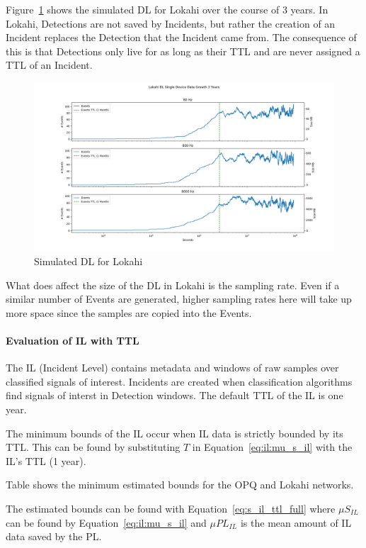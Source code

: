 Figure~\ref{fig:sim_dl_lokahi} shows the simulated DL for Lokahi over the course of 3 years. In Lokahi, Detections are not saved by Incidents, but rather the creation of an Incident replaces the Detection that the Incident came from. The consequence of this is that Detections only live for as long as their TTL and are never assigned a TTL of an Incident.

\begin{figure}[H]
	\centering
	\includegraphics[width=\linewidth]{figures/sim_dl_lokahi.png}
	\caption{Simulated DL for Lokahi}
	\label{fig:sim_dl_lokahi}
\end{figure}

What does affect the size of the DL in Lokahi is the sampling rate. Even if a similar number of Events are generated, higher sampling rates here will take up more space since the samples are copied into the Events.

\paragraph{Evaluation of IL with TTL}

The IL (Incident Level) contains metadata and windows of raw samples over classified signals of interest. Incidents are created when classification algorithms find signals of interst in Detection windows. The default TTL of the IL is one year.

The minimum bounds of the IL occur when IL data is strictly bounded by its TTL. This can be found by substituting $T$ in Equation~\ref{eq:il:mu_s_il} with the IL's TTL (1 year).

Table shows the minimum estimated bounds for the OPQ and Lokahi networks.


The estimated bounds can be found with Equation~\ref{eq:s_il_ttl_full} where $\mu S_{IL}$ can be found by Equation~\ref{eq:il:mu_s_il} and $\mu PL_{IL}$ is the mean amount of IL data saved by the PL.

